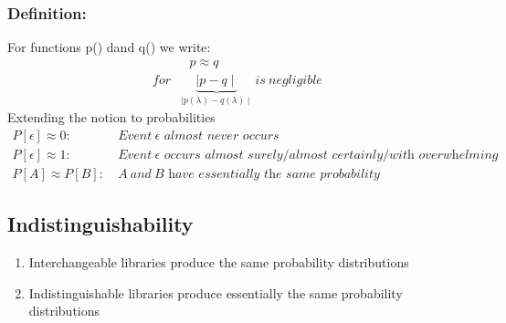 \documentclass{report}
\begin{document}
\subsubsection*{Definition:}
For functions p() dand q() we write:
\begin{align*}
	& \ \ \ p \approx q \\
	for & \underbrace{\mid p-q \mid}_{\mid p(\lambda) - q(\lambda) \mid} \ is \ negligible
\end{align*}
Extending the notion to probabilities
\begin{align*}
	P[\epsilon] \approx 0: & \ Event \ \epsilon \textit{ almost never occurs} \\
	P[\epsilon] \approx 1: & \ Event \ \epsilon \textit{ occurs almost surely/almost certainly/with overwhelming probability} \\
	P[A] \approx P[B]: & \ A \ and \ B \textit{ have essentially the same probability}
\end{align*}
\subsection*{Indistinguishability}
\begin{enumerate} [\textbullet]
 \item Interchangeable libraries produce the same probability distributions
 \item Indistinguishable libraries produce essentially the same probability distributions
\end{enumerate}
\end{document}
